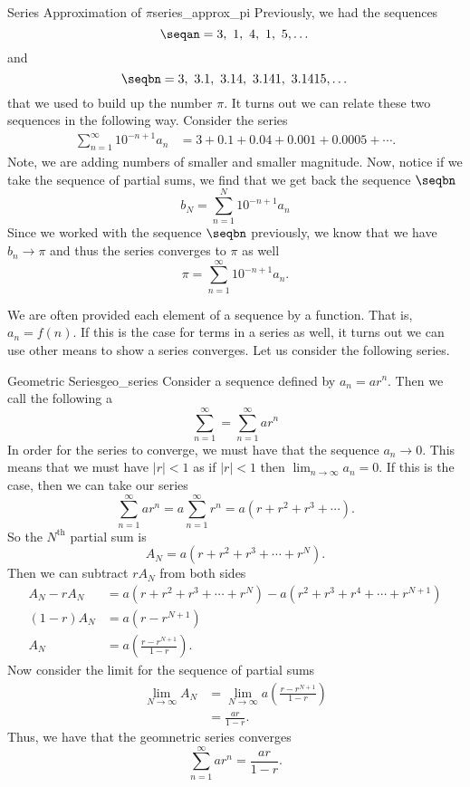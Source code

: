 \begin{ex}{Series Approximation of $\pi$}{series_approx_pi}
Previously, we had the sequences
\[
\seqan = 3,~1,~4,~1,~5, \dots
\]
and
\[
\seqbn = 3,~3.1,~3.14,~3.141,~3.1415,\dots
\]
that we used to build up the number $\pi$.  It turns out we can relate these two sequences in the following way.  Consider the series
\begin{align*}
\sum_{n=1}^\infty 10^{-n+1} a_n &= 3+0.1+0.04+0.001+0.0005+\cdots.
\end{align*}
Note, we are adding numbers of smaller and smaller magnitude. Now, notice if we take the sequence of partial sums, we find that we get back the sequence $\seqbn$
\[
b_N = \sum_{n=1}^N 10^{-n+1}a_n
\]
Since we worked with the sequence $\seqbn$ previously, we know that we have $b_n\to \pi$ and thus the series converges to $\pi$ as well
\[
\pi = \sum_{n=1}^\infty 10^{-n+1}a_n.
\]
\end{ex}

We are often provided each element of a sequence by a function. That is, $a_n=f(n)$.  If this is the case for terms in a series as well, it turns out we can use other means to show a series converges.  Let us consider the following series.

\begin{ex}{Geometric Series}{geo_series}
Consider a sequence defined by $a_n = ar^n$.  Then we call the following a 
\[
\sum_{n=1}^\infty = \sum_{n=1}^\infty ar^n
\]
In order for the series to converge, we must have that the sequence $a_n \to 0$.  This means that we must have $|r|<1$ as if $|r|<1$ then $\lim_{n\to \infty} a_n =0$. If this is the case, then we can take our series
\[
\sum_{n=1}^\infty ar^n = a\sum_{n=1}^\infty r^n = a(r+r^2+r^3+\cdots).
\]
So the $N^\textrm{th}$ partial sum is
\[
A_{N} = a(r+r^2+r^3+\cdots+r^{N}).
\]
Then we can subtract $rA_N$ from both sides
\begin{align*}
A_N - rA_N &= a(r+r^2+r^3+\cdots+r^N) - a(r^2+r^3+r^4+\cdots+r^{N+1})\\
 (1-r)A_N&=a(r-r^{N+1})\\
 A_N &= a\left( \frac{r-r^{N+1}}{1-r}\right).
\end{align*}
Now consider the limit for the sequence of partial sums
\begin{align*}
\lim_{N\to \infty} A_N &= \lim_{N \to \infty} a\left(\frac{r-r^{N+1}}{1-r}\right)\\
&=\frac{ar}{1-r}.
\end{align*}
Thus, we have that the geomnetric series converges
\[
\boxed{\sum_{n=1}^\infty ar^n = \frac{ar}{1-r}.}
\]
\end{ex}

